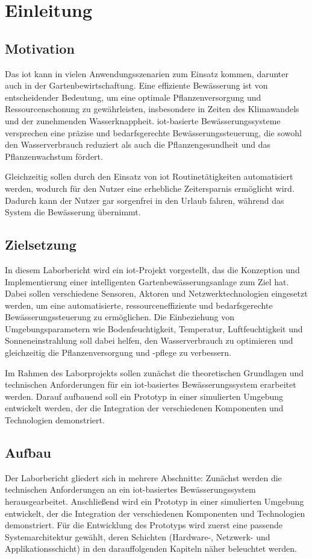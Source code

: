 
\section{Einleitung}

\subsection{Motivation}
Das \gls{iot} kann in vielen Anwendungsszenarien zum Einsatz kommen, darunter auch in der Gartenbewirtschaftung. Eine effiziente Bewässerung ist von entscheidender Bedeutung, um eine optimale Pflanzenversorgung und Ressourcenschonung zu gewährleisten, insbesondere in Zeiten des Klimawandels und der zunehmenden Wasserknappheit. \gls{iot}-basierte Bewässerungssysteme versprechen eine präzise und bedarfsgerechte Bewässerungssteuerung, die sowohl den Wasserverbrauch reduziert als auch die Pflanzengesundheit und das Pflanzenwachstum fördert.

Gleichzeitig sollen durch den Einsatz von \gls{iot} Routinetätigkeiten automatisiert werden, wodurch für den Nutzer eine erhebliche Zeitersparnis ermöglicht wird.
Dadurch kann der Nutzer gar sorgenfrei in den Urlaub fahren, während das System die Bewässerung übernimmt.

\subsection{Zielsetzung}

In diesem Laborbericht wird ein \gls{iot}-Projekt vorgestellt, das die Konzeption und Implementierung einer intelligenten Gartenbewässerungsanlage zum Ziel hat. Dabei sollen verschiedene Sensoren, Aktoren und Netzwerktechnologien eingesetzt werden, um eine automatisierte, ressourceneffiziente und bedarfsgerechte Bewässerungssteuerung zu ermöglichen. Die Einbeziehung von Umgebungsparametern wie Bodenfeuchtigkeit, Temperatur, Luftfeuchtigkeit und Sonneneinstrahlung soll dabei helfen, den Wasserverbrauch zu optimieren und gleichzeitig die Pflanzenversorgung und -pflege zu verbessern.

Im Rahmen des Laborprojekts sollen zunächst die theoretischen Grundlagen und technischen Anforderungen für ein \gls{iot}-basiertes Bewässerungssystem erarbeitet werden. Darauf aufbauend soll ein Prototyp in einer simulierten Umgebung entwickelt werden, der die Integration der verschiedenen Komponenten und Technologien demonstriert.

\subsection{Aufbau}

Der Laborbericht gliedert sich in mehrere Abschnitte: Zunächst werden die technischen Anforderungen an ein \gls{iot}-basiertes Bewässerungssystem herausgearbeitet. Anschließend wird ein Prototyp in einer simulierten Umgebung entwickelt, der die Integration der verschiedenen Komponenten und Technologien demonstriert. Für die Entwicklung des Prototyps wird zuerst eine passende Systemarchitektur gewählt, deren Schichten (Hardware-, Netzwerk- und Applikationsschicht) in den darauffolgenden Kapiteln näher beleuchtet werden.
